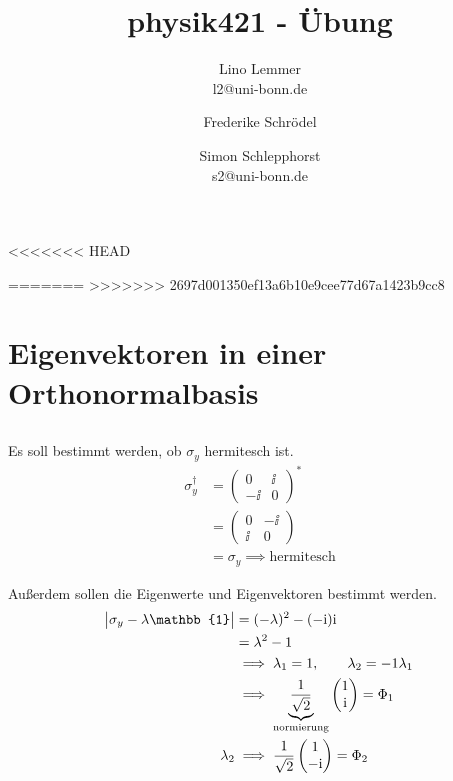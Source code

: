 

\setcounter{thezettel}{8}
\renewcommand\thesection{\arabic{thezettel}.\arabic{section}}

\newcommand{\ui}[1]{\int_{-\infty}^{\infty}\dif {#1}\;}
\newcommand\ccancel[2][black]{\renewcommand\CancelColor{\color{#1}}\cancel{#2}}


\title{physik421 - Übung }
\author{Lino Lemmer \\ \small{l2@uni-bonn.de} \and Frederike Schrödel \and Simon Schlepphorst\\ \small{s2@uni-bonn.de}}


\maketitle

<<<<<<< HEAD


=======
>>>>>>> 2697d001350ef13a6b10e9cee77d67a1423b9cc8
\section{Eigenvektoren in einer Orthonormalbasis}
\subsection{}
Es soll bestimmt werden, ob $\sigma_y$ hermitesch ist.
\begin{align*}
    \sigma^\dagger_y &= 
    \begin{pmatrix}
        0 &\ii \\
        -\ii &0
    \end{pmatrix}^* \\
    &= \begin{pmatrix}
        0 &-\ii \\
        \ii &0
    \end{pmatrix} \\
    &= \sigma_y \implies \text{hermitesch}
\end{align*}

Außerdem sollen die Eigenwerte und Eigenvektoren bestimmt werden.
\begin{align*}
    \abs{\sigma_y-\lambda\mathbb{1}} &= (-\lambda)^2-(-\ii)\ii \\
                                    &= \lambda^2-1 \\
                                    &\implies \lambda_1 =1, \qquad \lambda_2 = -1
    \lambda_1 \\
    &\implies \underbrace{\frac{1}{\sqrt{2}}}_\text{normierung}\begin{pmatrix}
        1 \\ \ii
    \end{pmatrix} = \Phi_1\\
    \lambda_2 &\implies \frac 1{\sqrt 2}\begin{pmatrix}
        1 \\ -\ii
    \end{pmatrix} = \Phi_2
\end{align*}

